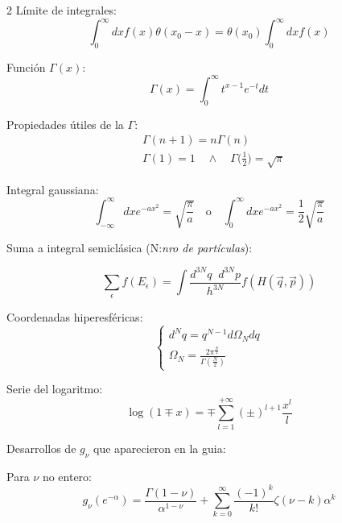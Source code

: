 \documentclass[a4, 12pt]{article}
\begin{document}
\begin{multicols}{2}
    Límite de integrales:
    \begin{equation*}
      \int_{0}^{\infty}dx f(x) \theta(x_0 - x) = \theta(x_0)\int_0^\infty dxf(x)
    \end{equation*}

    Función $\Gamma(x)$:
    \begin{equation*}
      \Gamma(x) = \int_{0}^{\infty}t^{x-1}e^{-t}dt
    \end{equation*}

    Propiedades útiles de la $\Gamma$:
    \begin{equation*}
      \begin{aligned}
        &\Gamma(n + 1) = n\Gamma(n) \\
        &\Gamma(1) = 1 \quad \wedge \quad \Gamma\bigg(\frac12\bigg) = \sqrt{\pi}
      \end{aligned}
    \end{equation*}

    Integral gaussiana:
    \begin{equation*}
      \int_{-\infty}^{\infty} dxe^{-ax^2} = \sqrt{\frac{\pi}{a}} \quad \text{o} \quad \int_{0}^{\infty} dxe^{-ax^2} = \frac12\sqrt{\frac{\pi}{a}}
    \end{equation*}

    Suma a integral semiclásica (N:\textit{nro de partículas}):

    \begin{equation*}
      \sum_{\epsilon}f(E_{\epsilon}) = \int \frac{d^{3N}q \;\; d^{3N}p}{h^{3N}}f(H(\vec{q}, \vec{p}))
    \end{equation*}

    Coordenadas hiperesféricas:
    \begin{equation*}
      \begin{cases} 
      d^{N}q = q^{N - 1} d\Omega_{N}dq\\
      \Omega_N = \frac{2\pi^{\frac{N}{2}}}{\Gamma(\frac{N}{2})}
      \end{cases}
    \end{equation*}

    Serie del logaritmo:
    \begin{equation*}
      \log(1 \mp x) = \mp \sum_{l = 1}^{+\infty} (\pm)^{l+1} \frac{x^l}{l}
    \end{equation*}
    
    Desarrollos de $g_{\nu}$ que aparecieron en la guia:

    Para $\nu$ no entero:
    \begin{equation*}
      g_{\nu}(e^{-\alpha}) = \frac{\Gamma(1-\nu)}{\alpha^{1-\nu}} + \sum_{k=0}^{\infty}\frac{(-1)^k}{k!}\zeta(\nu - k) \alpha^{k}
    \end{equation*}


\end{multicols}
\end{document}
